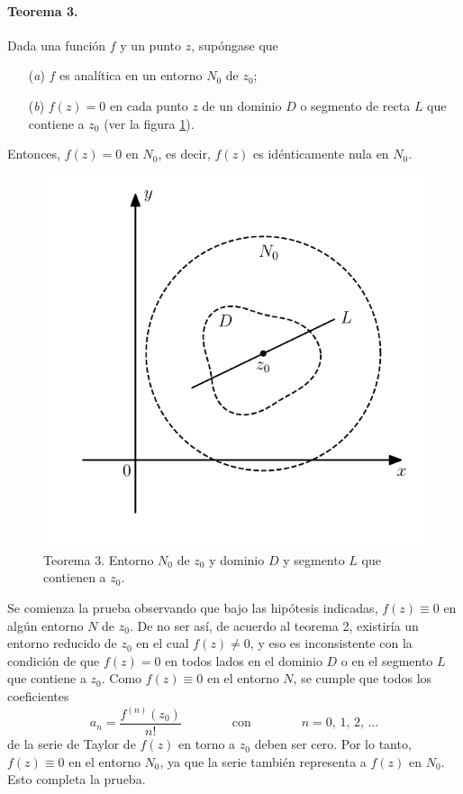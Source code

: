 \documentclass[a4paper]{report}
\begin{document}
\paragraph{Teorema 3.} Dada una función \(f\) y un punto \(z\), supóngase que 
\begin{enumerate}
 \item[(\textit{a})] \(f\) es analítica en un entorno \(N_0\) de \(z_0\);
 \item[(\textit{b})] \(f(z)=0\) en cada punto \(z\) de un dominio \(D\) o segmento de recta \(L\) que contiene a \(z_0\) (ver la figura \ref{fig:zeros_theorem_3}).
\end{enumerate}
Entonces, \(f(z)=0\) en \(N_0\), es decir, \(f(z)\) es idénticamente nula en \(N_0\).
\begin{figure}[!htb]
  \begin{minipage}[c]{0.5\textwidth}
    \includegraphics[width=\textwidth]{figuras/zeros_theorem_3.pdf}
  \end{minipage}\hfill
  \begin{minipage}[c]{0.4\textwidth}
    \caption{
       Teorema 3. Entorno \(N_0\) de \(z_0\) y dominio \(D\) y segmento \(L\) que contienen a \(z_0\).
    }\label{fig:zeros_theorem_3}
  \end{minipage}
\end{figure}

Se comienza la prueba observando que bajo las hipótesis indicadas, \(f(z)\equiv0\) en algún entorno \(N\) de \(z_0\). De no ser así, de acuerdo al teorema 2, existiría un entorno reducido de \(z_0\) en el cual \(f(z)\neq0\), y eso es inconsistente con la condición de que \(f(z)=0\) en todos lados en el dominio \(D\) o en el segmento \(L\) que contiene a \(z_0\). Como \(f(z)\equiv0\) en el entorno \(N\), se cumple que todos los coeficientes 
\[
 a_n=\frac{f^{(n)}(z_0)}{n!}
 \qquad\qquad\textrm{con}\qquad\qquad
 n=0,\,1,\,2,\,\dots
\]
de la serie de Taylor de \(f(z)\) en torno a \(z_0\) deben ser cero. Por lo tanto, \(f(z)\equiv0\) en el entorno \(N_0\), ya que la serie también representa a \(f(z)\) en \(N_0\). Esto completa la prueba.
\end{document}
